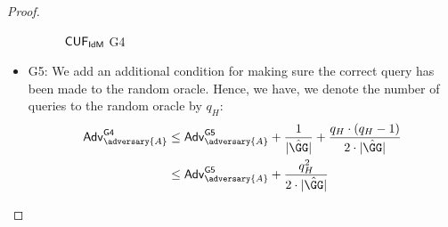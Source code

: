 \begin{proof}
\begin{itemize}
\begin{figure*}
{\begin{pchstack}[center, space=0.2cm, boxed]
\begin{pcvstack}
    \end{pcvstack}
    \end{pchstack}
}
\caption{$\mathsf{CUF}_{\textsf{IdM}}$ \textsf{G4}}
\label{game:cuf_idmg3}
\end{figure*}

\item \textsf{G5}: We add an additional condition for making sure the correct query has been made to the random oracle. Hence, we have, we denote the number of queries to the random oracle by $q_H$:
        \begin{align*}
            \advtg_\adversary{A}^{\mathsf{G4}} &\le \advtg_\adversary{A}^{\mathsf{G5}}  + \frac{1}{|\GGhat|} + \frac{q_H\cdot(q_H-1)}{2\cdot |\GGhat|}\\
            &\le \advtg_\adversary{A}^{\mathsf{G5}} + \frac{q_H^2}{2\cdot |\GGhat|}
        \end{align*}




\end{itemize}
\end{proof}

